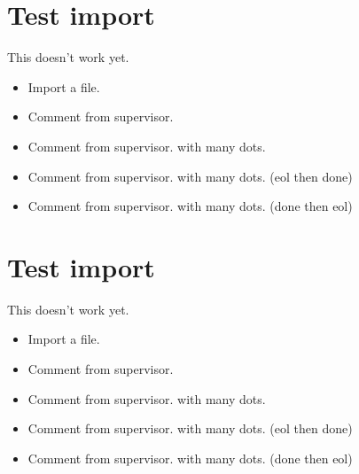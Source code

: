 \chapter{Test import}
\label{autosec:8}
This doesn't work yet.
    \begin{itemize}[noitemsep]
        \item {\color{red}Import a file.}
        \item {\color{WildStrawberry}Comment from supervisor.}
        \item {\color{WildStrawberry}Comment from supervisor. with many dots.}
        \item {\color{Gray}Comment from supervisor. with many dots. (eol then done)}
        \item {\color{Gray}Comment from supervisor. with many dots. (done then eol)}
    \end{itemize}
\chapter{Test import}
\label{autosec:9}
This doesn't work yet.
    \begin{itemize}[noitemsep]
        \item {\color{red}Import a file.}
        \item {\color{WildStrawberry}Comment from supervisor.}
        \item {\color{WildStrawberry}Comment from supervisor. with many dots.}
        \item {\color{Gray}Comment from supervisor. with many dots. (eol then done)}
        \item {\color{Gray}Comment from supervisor. with many dots. (done then eol)}
    \end{itemize}

